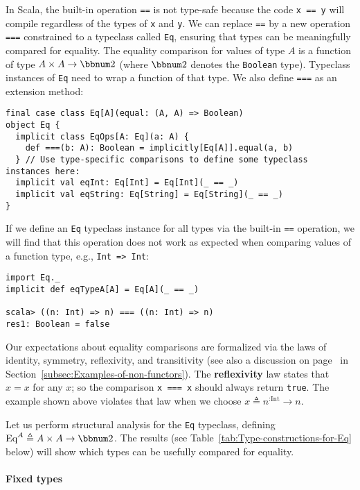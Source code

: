 In Scala, the built-in operation \lstinline!==! is not type-safe
because the code \lstinline!x == y! will compile regardless of the
types of \lstinline!x! and \lstinline!y!. We can replace \lstinline!==!
by a new operation \lstinline!===! constrained to a typeclass called
\lstinline!Eq!, ensuring that types can be meaningfully compared
for equality. The equality comparison for values of type $A$ is a
function of type $A\times A\rightarrow\bbnum 2$ (where $\bbnum 2$
denotes the \lstinline!Boolean! type). Typeclass instances of \lstinline!Eq!
need to wrap a function of that type. We also define \lstinline!===!
as an extension method:
\begin{lstlisting}
final case class Eq[A](equal: (A, A) => Boolean)
object Eq {
  implicit class EqOps[A: Eq](a: A) {
    def ===(b: A): Boolean = implicitly[Eq[A]].equal(a, b)
  } // Use type-specific comparisons to define some typeclass instances here:
  implicit val eqInt: Eq[Int] = Eq[Int](_ == _)
  implicit val eqString: Eq[String] = Eq[String](_ == _)
}
\end{lstlisting}
If we define an \lstinline!Eq! typeclass instance for all types via
the built-in \lstinline!==! operation, we will find that this operation
does not work as expected when comparing values of a function type,
e.g., \lstinline!Int => Int!: 
\begin{lstlisting}
import Eq._
implicit def eqTypeA[A] = Eq[A](_ == _)

scala> ((n: Int) => n) === ((n: Int) => n)
res1: Boolean = false 
\end{lstlisting}
Our expectations about equality comparisons are formalized via the
laws of identity, symmetry, reflexivity, and transitivity (see also
a discussion on page~\pageref{par:label-equality-laws} in Section~\ref{subsec:Examples-of-non-functors}).
The \textbf{reflexivity} law states that $x=x$
for any $x$; so the comparison \lstinline!x === x! should always
return \lstinline!true!. The example shown above violates that law
when we choose $x\triangleq n^{:\text{Int}}\rightarrow n$.

Let us perform structural analysis for the \lstinline!Eq! typeclass,
defining $\text{Eq}^{A}\triangleq A\times A\rightarrow\bbnum 2$.
The results (see Table~\ref{tab:Type-constructions-for-Eq} below)
will show which types can be usefully compared for equality.

\paragraph{Fixed types}

